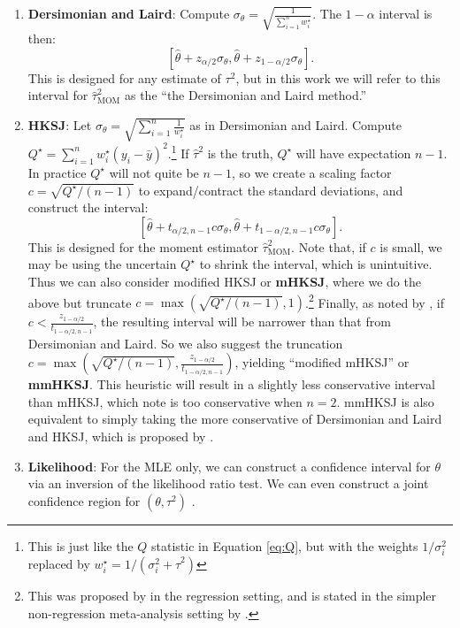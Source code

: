 \documentclass[letterpaper,12pt]{article}
\begin{document}
\begin{enumerate}
  \item \textbf{Dersimonian and Laird}: Compute $\sigma_\theta=\sqrt{\frac{1}{\sum_{i=1}^nw_i^\star}}$. The $1-\alpha$ interval is then:
  \begin{equation}
    \left[\hat\theta+z_{\alpha/2}\sigma_\theta,\hat\theta+z_{1-\alpha/2}\sigma_\theta\right].
  \end{equation}
  This is designed for any estimate of $\tau^2$, but in this work we will refer to this interval for $\hat\tau^2_{\mathrm{MOM}}$ as the ``the Dersimonian and Laird method.''
  \item \textbf{HKSJ}: Let $\sigma_\theta=\sqrt{\sum_{i=1}^n\frac{1}{w_i^\star}}$ as in Dersimonian and Laird. Compute $Q^\star=\sum_{i=1}^n w_i^\star(y_i-\bar{y})^2$.\footnote{This is just like the $Q$ statistic in Equation \ref{eq:Q}, but with the weights $1/\sigma_i^2$ replaced by $w_i^\star=1/(\sigma_i^2+\hat\tau^2)$} If $\hat\tau^2$ is the truth, $Q^\star$ will have expectation $n-1$. In practice $Q^\star$ will not quite be $n-1$, so we create a scaling factor $c=\sqrt{Q^\star/(n-1)}$ to expand/contract the standard deviations, and construct the interval:
  \begin{equation}
    \left[\hat\theta+t_{\alpha/2,n-1}c\sigma_\theta,\hat\theta+t_{1-\alpha/2,n-1}c\sigma_\theta\right].
  \end{equation}
  This is designed for the moment estimator $\hat\tau^2_{\mathrm{MOM}}$. Note that, if $c$ is small, we may be using the uncertain $Q^\star$ to shrink the interval, which is unintuitive. Thus we can also consider modified HKSJ or \textbf{mHKSJ}, where we do the above but truncate $c=\max\left(\sqrt{Q^\star/(n-1)},1\right)$.\footnote{This was proposed by \citet{knapp2003improved} in the regression setting, and is stated in the simpler non-regression meta-analysis setting by \citet{rover2015hartung}.} Finally, as noted by \citet{rover2015hartung}, if $c<\frac{z_{1-\alpha/2}}{t_{1-\alpha/2,n-1}}$, the resulting interval will be narrower than that from Dersimonian and Laird. So we also suggest the truncation $c=\max\left(\sqrt{Q^\star/(n-1)},\frac{z_{1-\alpha/2}}{t_{1-\alpha/2,n-1}}\right)$, yielding ``modified mHKSJ'' or \textbf{mmHKSJ}. This heuristic will result in a slightly less conservative interval than mHKSJ, which \citet{rover2015hartung} note is too conservative when $n=2$. mmHKSJ is also equivalent to simply taking the more conservative of Dersimonian and Laird and HKSJ, which is proposed by \citet[Section 4.5]{jackson2017hartung}.
  \item \textbf{Likelihood}: For the MLE only, we can construct a confidence interval for $\theta$ via an inversion of the likelihood ratio test. We can even construct a joint confidence region for $(\theta,\tau^2)$ \citep{hardy1996likelihood}.
\end{enumerate}
\end{document}
